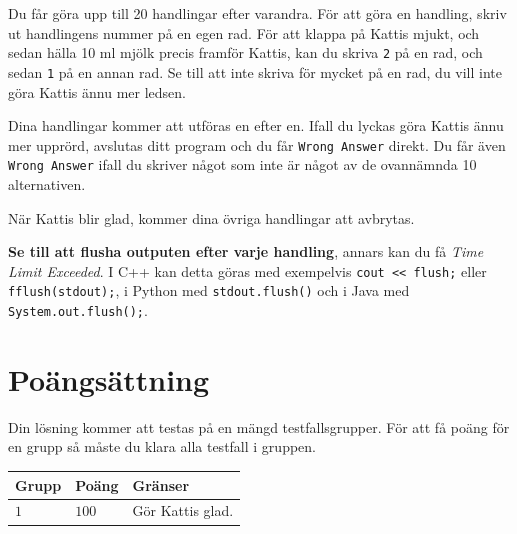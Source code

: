 Du får göra upp till 20 handlingar efter varandra.
För att göra en handling, skriv ut handlingens nummer på en egen rad. För att klappa på Kattis mjukt, 
och sedan hälla 10 ml mjölk precis framför Kattis, kan du skriva \texttt{2} på en rad, och sedan \texttt{1} på en annan rad.
Se till att inte skriva för mycket på en rad, du vill inte göra Kattis ännu mer ledsen. 

Dina handlingar kommer att utföras en efter en. Ifall du lyckas göra Kattis ännu mer upprörd, 
avslutas ditt program och du får \texttt{Wrong Answer} direkt. 
Du får även \texttt{Wrong Answer} ifall du skriver något som inte är något av de ovannämnda 10 alternativen.

När Kattis blir glad, kommer dina övriga handlingar att avbrytas.

\textbf{Se till att flusha outputen efter varje handling}, annars kan du få \textit{Time Limit Exceeded}.
I C++ kan detta göras med exempelvis \texttt{cout << flush;}
eller \texttt{fflush(stdout);},
i Python med \texttt{stdout.flush()}
och i Java med \texttt{System.out.flush();}.

\section*{Poängsättning}
Din lösning kommer att testas på en mängd testfallsgrupper.
För att få poäng för en grupp så måste du klara alla testfall i gruppen.

\noindent
\begin{tabular}{| l | l | l |}
  \hline
  \textbf{Grupp} & \textbf{Poäng} & \textbf{Gränser} \\ \hline
  $1$   & $100$        & Gör Kattis glad. \\ \hline
\end{tabular}
